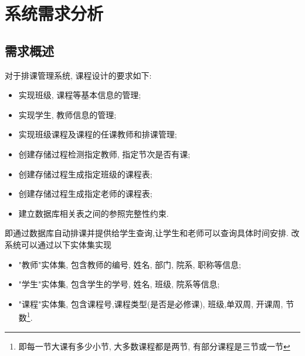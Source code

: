\documentclass[UTF8]{ctexart}
\begin{document}


\newpage
\tableofcontents
\newpage

\section{系统需求分析}
  \subsection{需求概述}
    对于排课管理系统, 课程设计的要求如下:
    \begin{itemize}
      \item 实现班级, 课程等基本信息的管理;
      \item 实现学生, 教师信息的管理;
      \item 实现班级课程及课程的任课教师和排课管理;
      \item 创建存储过程检测指定教师, 指定节次是否有课;
      \item 创建存储过程生成指定班级的课程表;
      \item 创建存储过程生成指定老师的课程表;
      \item 建立数据库相关表之间的参照完整性约束.
    \end{itemize}

    即通过数据库自动排课并提供给学生查询,让学生和老师可以查询具体时间安排.
    改系统可以通过以下实体集实现
    \begin{itemize}
      \item "教师"实体集, 包含教师的编号, 姓名, 部门, 院系, 职称等信息;
      \item "学生"实体集, 包含学生的学号, 姓名, 班级, 院系等信息;
      \item "课程"实体集, 包含课程号,课程类型(是否是必修课), 班级,单双周, 开课周, 节数\footnote{即每一节大课有多少小节, 大多数课程都是两节, 有部分课程是三节或一节}.
    \end{itemize}



\nocite{silberschatz1997database} %
\nocite{sqldbm} %
\end{document}
